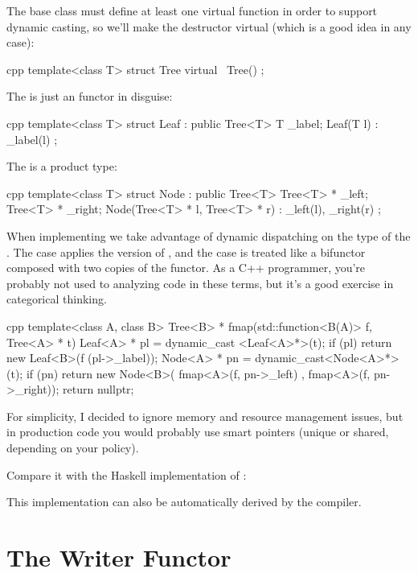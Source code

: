 The base class must define at least one virtual function in order to
support dynamic casting, so we'll make the destructor virtual (which is
a good idea in any case):

\begin{snip}{cpp}
template<class T>
struct Tree { 
    virtual ~Tree() {}
};
\end{snip}
The  is just an  functor in disguise:

\begin{snip}{cpp}
template<class T>
struct Leaf : public Tree<T> {
    T _label;
    Leaf(T l) : _label(l) {}
};
\end{snip}
The  is a product type:

\begin{snip}{cpp}
template<class T>
struct Node : public Tree<T> {
    Tree<T> * _left;
    Tree<T> * _right;
    Node(Tree<T> * l, Tree<T> * r) : _left(l), _right(r) {}
};
\end{snip}
When implementing  we take advantage of dynamic dispatching
on the type of the . The  case applies the
 version of , and the  case
is treated like a bifunctor composed with two copies of the
 functor. As a C++ programmer, you're probably not used to
analyzing code in these terms, but it's a good exercise in categorical
thinking.

\begin{snip}{cpp}
template<class A, class B>
Tree<B> * fmap(std::function<B(A)> f, Tree<A> * t) {
    Leaf<A> * pl = dynamic_cast <Leaf<A>*>(t);
    if (pl)
        return new Leaf<B>(f (pl->_label));
    Node<A> * pn = dynamic_cast<Node<A>*>(t);
    if (pn)
        return new Node<B>( fmap<A>(f, pn->_left) 
                          , fmap<A>(f, pn->_right));
    return nullptr;
}
\end{snip}
For simplicity, I decided to ignore memory and resource management
issues, but in production code you would probably use smart pointers
(unique or shared, depending on your policy).

Compare it with the Haskell implementation of :

This implementation can also be automatically derived by the compiler.

\section{The Writer Functor}

